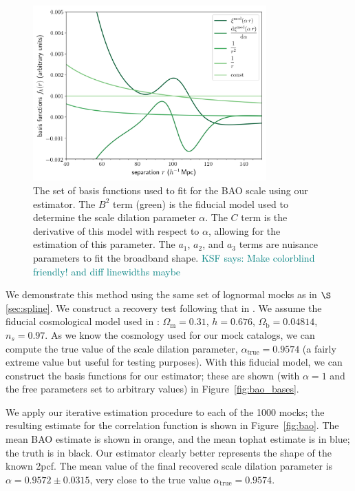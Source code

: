 \documentclass[modern]{aastex62}
\newcommand{\cf}{2pcf\xspace} %
\newcommand{\KSF}[1]{\textcolor{teal}{KSF says: #1}}
\begin{document}
\label{fig:bao_bases}
\begin{figure}[ht]
\centering
    \includegraphics[width=0.8\textwidth]{bao_bases}
    \caption{The set of basis functions used to fit for the BAO scale using our estimator. The $B^2$ term (green) is the fiducial model used to determine the scale dilation parameter $\alpha$. The $C$ term is the derivative of this model with respect to $\alpha$, allowing for the estimation of this parameter. The $a_1$, $a_2$, and $a_3$ terms are nuisance parameters to fit the broadband shape. \KSF{Make colorblind friendly! and diff linewidths maybe}}
\end{figure}

We demonstrate this method using the same set of lognormal mocks as in $\S$\ref{sec:spline}.
We construct a recovery test following that in \cite{Hinton2019}.
We assume the fiducial cosmological model used in \cite{Beutler2017}: $\Omega_{\text{m}} = 0.31$, $h = 0.676$, $\Omega_{\text{b}} = 0.04814$, $n_s = 0.97$. 
As we know the cosmology used for our mock catalogs, we can compute the true value of the scale dilation parameter, $\alpha_{\text{true}}=0.9574$ (a fairly extreme value but useful for testing purposes).
With this fiducial model, we can construct the basis functions for our estimator; these are shown (with $\alpha=1$ and the free parameters set to arbitrary values) in Figure~\ref{fig:bao_bases}.

We apply our iterative estimation procedure to each of the 1000 mocks; the resulting estimate for the correlation function is shown in Figure~\ref{fig:bao}.
The mean BAO estimate is shown in orange, and the mean tophat estimate is in blue; the truth is in black.
Our estimator clearly better represents the shape of the known \cf.
The mean value of the final recovered scale dilation parameter is $\alpha=0.9572 \pm 0.0315$, very close to the true value $\alpha_{\text{true}}=0.9574$.
\end{document}
